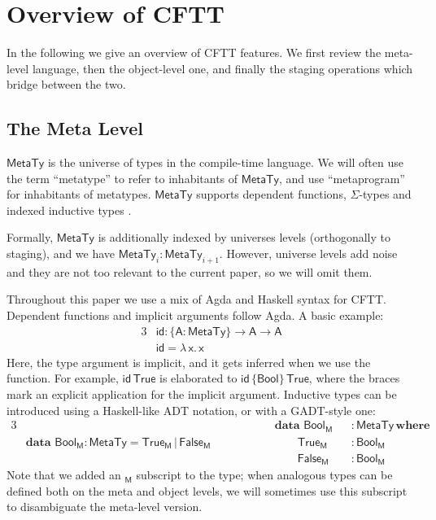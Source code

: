 \documentclass[acmsmall,screen,review,anonymous]{acmart}
\newcommand{\mit}[1]{{\mathsf{#1}}}
\newcommand{\msf}[1]{{\mathsf{#1}}}
\newcommand{\mbf}[1]{{\mathbf{#1}}}
\newcommand{\bs}[1]{\boldsymbol{#1}}
\newcommand{\ind}{\hspace{1em}}
\newcommand{\lam}{\lambda\,}
\newcommand{\data}{\mbf{data}\,}
\newcommand{\where}{\mbf{where}}
\newcommand{\M}{\msf{M}}
\newcommand{\vA}{\mathsf{A}}
\newcommand{\vx}{\mathsf{x}}
\newcommand{\Bool}{\msf{Bool}}
\newcommand{\MTy}{\msf{MetaTy}}
\newcommand{\True}{\msf{True}}
\newcommand{\False}{\msf{False}}
\theoremstyle{remark}
\newcommand{\id}{\mit{id}}
\begin{document}
\section{Overview of CFTT}\label{sec:overview-of-cftt}

In the following we give an overview of CFTT features. We first review the
meta-level language, then the object-level one, and finally the staging
operations which bridge between the two.

\subsection{The Meta Level}\label{sec:the-meta-level}

$\bs{\MTy}$ is the universe of types in the compile-time language. We will often
use the term ``metatype'' to refer to inhabitants of $\MTy$, and use
``metaprogram'' for inhabitants of metatypes. $\MTy$ supports dependent
functions, $\Sigma$-types and indexed inductive types \cite{inductivefamilies}.

Formally, $\MTy$ is additionally indexed by universes levels (orthogonally to
staging), and we have $\MTy_i : \MTy_{i+1}$. However, universe levels add noise
and they are not too relevant to the current paper, so we will omit them.

Throughout this paper we use a mix of Agda and Haskell syntax for
CFTT. Dependent functions and implicit arguments follow Agda. A basic example:
\begin{alignat*}{3}
  &\id : \{\vA : \MTy\} \to \vA \to \vA\\
  &\id = \lam \vx.\, \vx
\end{alignat*}
Here, the type argument is implicit, and it gets inferred when we use the
function. For example, $\id\,\True$ is elaborated to $\id\,\{\Bool\}\,\True$,
where the braces mark an explicit application for the implicit argument.
Inductive types can be introduced using a Haskell-like ADT notation, or with a
GADT-style one:
\begin{alignat*}{3}
  &                                           &&\hspace{4em}\data\,\Bool_\M &&: \MTy\,\where\\
  & \data\,\Bool_\M : \MTy = \True_\M\,|\,\False_\M &&\hspace{4em}\ind\ind \True_\M &&: \Bool_\M\\
  &                                           &&\hspace{4em}\ind\ind \False_\M &&: \Bool_\M
\end{alignat*}
Note that we added an $_\M$ subscript to the type; when analogous types can be
defined both on the meta and object levels, we will sometimes use this subscript
to disambiguate the meta-level version.
\end{document}

